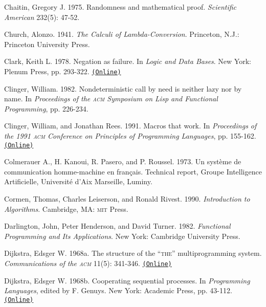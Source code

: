 \documentclass[8pt,oneside]{book}
\newcommand{\acronym}[1]{\textsc{\MakeLowercase{#1}}}
\newcommand{\code}[1]{\texttt{#1}}
\begin{document}
 \label{Chaitin 1975}
Chaitin, Gregory J.  1975.  Randomness and mathematical proof.
\textit{Scientific American} 232(5): 47-52.

 \label{Church (1941)}
Church, Alonzo.  1941.  \textit{The Calculi of Lambda-Conversion}.  Princeton,
N.J.: Princeton University Press.

 \label{Clark (1978)}
Clark, Keith L.  1978.  Negation as failure.  In \textit{Logic and Data Bases}.
New York: Plenum Press, pp. 293-322.
\href{http://www.doc.ic.ac.uk/~klc/neg.html}{\code{(Online)}}

 \label{Clinger (1982)}
Clinger, William.  1982.  Nondeterministic call by need is neither lazy nor by
name. In \textit{Proceedings of the \acronym{ACM} Symposium on Lisp and
Functional Programming}, pp. 226-234.

 \label{Clinger and Rees 1991}
Clinger, William, and Jonathan Rees.  1991.  Macros that work.  In
\textit{Proceedings of the 1991 \acronym{ACM} Conference on Principles of
Programming Languages}, pp. 155-162.
\href{http://mumble.net/~jar/pubs/macros_that_work.ps}{\code{(Online)}}

 \label{Colmerauer et al. 1973}
Colmerauer A., H. Kanoui, R. Pasero, and P. Roussel.  1973.  Un syst\`eme de
communication homme-machine en fran\c{c}ais.  Technical report, Groupe
Intelligence Artificielle, Universit\'e d'Aix Marseille, Luminy.

 \label{Cormen et al. 1990}
Cormen, Thomas, Charles Leiserson, and Ronald Rivest.  1990. \textit{Introduction
to Algorithms}. Cambridge, MA: \acronym{MIT} Press.

 \label{Darlington et al. 1982}
Darlington, John, Peter Henderson, and David Turner.  1982.  \textit{Functional
Programming and Its Applications}. New York: Cambridge University Press.

 \label{Dijkstra 1968a}
Dijkstra, Edsger W. 1968a.  The structure of the ``\acronym{THE}''
multiprogramming system.  \textit{Communications of the \acronym{ACM}}
11(5): 341-346.
\href{http://www.cs.utexas.edu/users/EWD/ewd01xx/EWD196.PDF}{\code{(Online)}}

 \label{Dijkstra 1968b}
Dijkstra, Edsger W. 1968b.  Cooperating sequential processes.  In
\textit{Programming Languages}, edited by F. Genuys. New York: Academic Press,
pp.  43-112.
\href{http://www.cs.utexas.edu/users/EWD/ewd01xx/EWD123.PDF}{\code{(Online)}}
\end{document}
